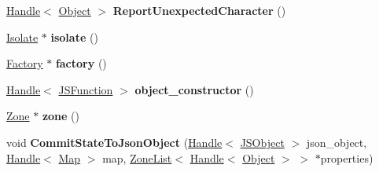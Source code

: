 \begin{DoxyCompactItemize}
\item 
\hyperlink{classv8_1_1internal_1_1_handle}{Handle}$<$ \hyperlink{classv8_1_1internal_1_1_object}{Object} $>$ {\bfseries Report\+Unexpected\+Character} ()\hypertarget{classv8_1_1internal_1_1_b_a_s_e___e_m_b_e_d_d_e_d_a428cc40d2410572bd8b2b8a3c0f400ae}{}\label{classv8_1_1internal_1_1_b_a_s_e___e_m_b_e_d_d_e_d_a428cc40d2410572bd8b2b8a3c0f400ae}

\item 
\hyperlink{classv8_1_1internal_1_1_isolate}{Isolate} $\ast$ {\bfseries isolate} ()\hypertarget{classv8_1_1internal_1_1_b_a_s_e___e_m_b_e_d_d_e_d_a32ada69909c248ae5d86cb56b08a5cc9}{}\label{classv8_1_1internal_1_1_b_a_s_e___e_m_b_e_d_d_e_d_a32ada69909c248ae5d86cb56b08a5cc9}

\item 
\hyperlink{classv8_1_1internal_1_1_factory}{Factory} $\ast$ {\bfseries factory} ()\hypertarget{classv8_1_1internal_1_1_b_a_s_e___e_m_b_e_d_d_e_d_ae4b4b4ca9ada9f897db92a9341be8c95}{}\label{classv8_1_1internal_1_1_b_a_s_e___e_m_b_e_d_d_e_d_ae4b4b4ca9ada9f897db92a9341be8c95}

\item 
\hyperlink{classv8_1_1internal_1_1_handle}{Handle}$<$ \hyperlink{classv8_1_1internal_1_1_j_s_function}{J\+S\+Function} $>$ {\bfseries object\+\_\+constructor} ()\hypertarget{classv8_1_1internal_1_1_b_a_s_e___e_m_b_e_d_d_e_d_a2ea64a9bcbcd1c2039ef1872d6e06cf5}{}\label{classv8_1_1internal_1_1_b_a_s_e___e_m_b_e_d_d_e_d_a2ea64a9bcbcd1c2039ef1872d6e06cf5}

\item 
\hyperlink{classv8_1_1internal_1_1_zone}{Zone} $\ast$ {\bfseries zone} ()\hypertarget{classv8_1_1internal_1_1_b_a_s_e___e_m_b_e_d_d_e_d_ae6214d54efe6726a23405b185be2aa97}{}\label{classv8_1_1internal_1_1_b_a_s_e___e_m_b_e_d_d_e_d_ae6214d54efe6726a23405b185be2aa97}

\item 
void {\bfseries Commit\+State\+To\+Json\+Object} (\hyperlink{classv8_1_1internal_1_1_handle}{Handle}$<$ \hyperlink{classv8_1_1internal_1_1_j_s_object}{J\+S\+Object} $>$ json\+\_\+object, \hyperlink{classv8_1_1internal_1_1_handle}{Handle}$<$ \hyperlink{classv8_1_1internal_1_1_map}{Map} $>$ map, \hyperlink{classv8_1_1internal_1_1_zone_list}{Zone\+List}$<$ \hyperlink{classv8_1_1internal_1_1_handle}{Handle}$<$ \hyperlink{classv8_1_1internal_1_1_object}{Object} $>$ $>$ $\ast$properties)\hypertarget{classv8_1_1internal_1_1_b_a_s_e___e_m_b_e_d_d_e_d_aa2ff2345ddb11f707d713bf8545a2015}{}\label{classv8_1_1internal_1_1_b_a_s_e___e_m_b_e_d_d_e_d_aa2ff2345ddb11f707d713bf8545a2015}


\end{DoxyCompactItemize}
